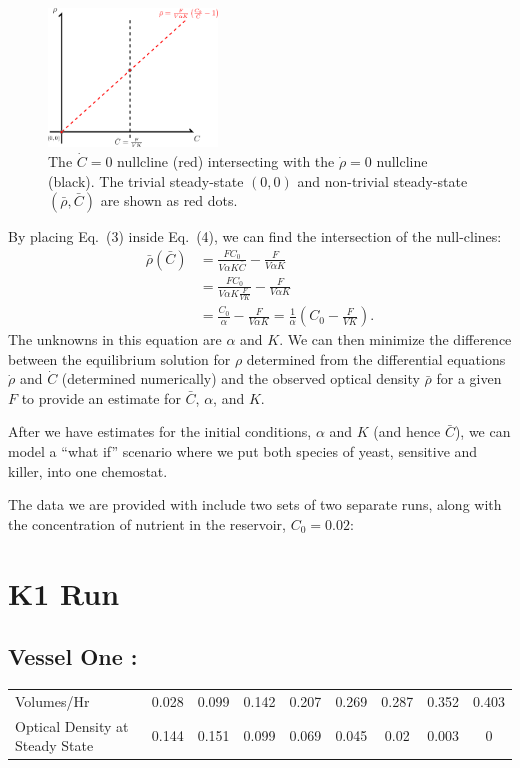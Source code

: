 \begin{multicols}{2}
\begin{figure}[H]
  \centering
    \includegraphics[width=0.40\textwidth]{images/drawing.png}
  \caption{\footnotesize The $\dot{C} = 0$ nullcline (red) intersecting with the $\dot{\rho} = 0$ nullcline (black).  The trivial steady-state $(0,0)$ and non-trivial steady-state $(\bar{\rho}, \bar{C})$ are shown as red dots.}
\end{figure}
\vfill
\columnbreak
By placing Eq.\ (3) inside Eq.\ (4), we can find the intersection of the null-clines:
\begin{align*}
  \bar{\rho}(\bar{C}) &= \frac{FC_0}{V \alpha K \bar{C}} - \frac{F}{V \alpha K} \\
  &= \frac{FC_0}{V \alpha K \frac{F}{VK}} - \frac{F}{V \alpha K} \\
  &= \frac{C_0}{\alpha} - \frac{F}{V \alpha K} = \frac{1}{\alpha} \left( C_0 - \frac{F}{VK} \right).
\end{align*}
The unknowns in this equation are $\alpha$ and $K$.  We can then minimize the difference between the equilibrium solution for $\rho$ determined from the differential equations $\dot{\rho}$ and $\dot{C}$ (determined numerically) and the observed optical density $\bar{\rho}$ for a given $F$ to provide an estimate for $\bar{C}$, $\alpha$, and $K$.
\end{multicols}

After we have estimates for the initial conditions, $\alpha$ and $K$ (and hence $\bar{C}$), we can model a ``what if'' scenario where we put both species of yeast, sensitive and killer, into one chemostat.

\newpage

The data we are provided with include two sets of two separate runs, along with the concentration of nutrient in the reservoir, $C_0 = 0.02$:
\section{K1 Run}
\subsection*{Vessel One :}
\begin{center}
\begin{tabular}{l|cccccccc}
  Volumes/Hr & 0.028 & 0.099 & 0.142 & 0.207 & 0.269 & 0.287 & 0.352 & 0.403 \\
  Optical Density at Steady State & 0.144 & 0.151 & 0.099 & 0.069 & 0.045 & 0.02 & 0.003 & 0 \\
\end{tabular}
\end{center}


